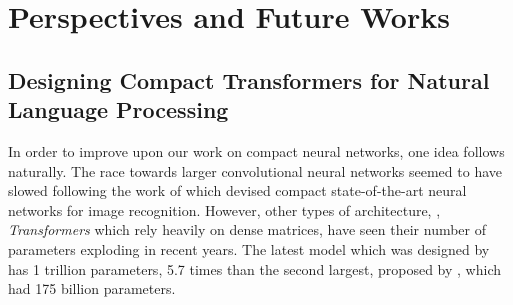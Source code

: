 \section{Perspectives and Future Works}
\label{section:ch6-perspectives_and_future_works}

\subsection{Designing Compact Transformers for Natural Language Processing}


In order to improve upon our work on compact neural networks, one idea follows naturally.
The race towards larger convolutional neural networks seemed to have slowed following the work of \citet{tan2019efficientnet} which devised compact state-of-the-art neural networks for image recognition.
However, other types of architecture, \eg, \emph{Transformers} which rely heavily on dense matrices, have seen their number of parameters exploding in recent years.
The latest model which was designed by \citet{fedus2021switch} has 1 trillion parameters, 5.7 times than the second largest, proposed by \citet{brown2020language}, which had 175 billion parameters.

